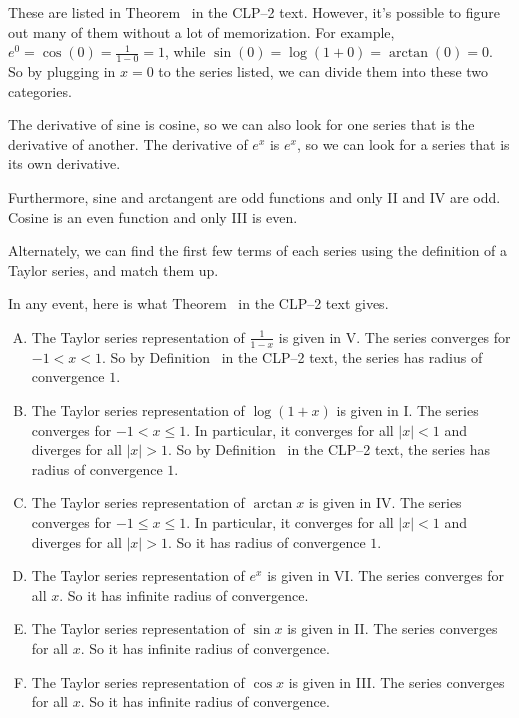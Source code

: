 \begin{solution}
These are listed in Theorem~ in the CLP--2 text. However, it's possible to figure out many of them without a lot of memorization. For example, $e^0=\cos(0)=\frac{1}{1-0}=1$, while $\sin(0)=\log(1+0)=\arctan(0)=0$. So by plugging in $x=0$ to the series listed, we can divide them into these two categories.

The derivative of sine is cosine, so we can also look for one series that is the derivative of another. The derivative of $e^x$ is $e^x$, so we can look for a series that is its own derivative.

Furthermore,      sine and arctangent are odd functions and only  II and IV are  odd.
Cosine is an even  function and only III is even.

Alternately, we can find the first few terms of each series using the definition of a Taylor series, and match them up.

In any event, here is what Theorem~ in the CLP--2 text gives.

\begin{enumerate}[(A)]
\item 
The Taylor series representation of $\frac{1}{1-x}$ is given in V. The series converges for $-1<x<1$. So by 
Definition~ in the CLP--2 text, the series has radius of convergence $1$.

\item 
The Taylor series representation of $\log(1+x)$ is given in I. The series converges for $-1<x\le 1$. In particular, it converges for all $|x|<1$ and diverges for all $|x|>1$. So by 
Definition~ in the CLP--2 text, the series has radius of convergence $1$.

\item 
The Taylor series representation of $\arctan x$ is given in IV. The series converges for $-1\le x\le 1$. In particular, it converges for all $|x|<1$ and diverges for all $|x|>1$. So it has radius of convergence $1$.

\item 
The Taylor series representation of $e^x$ is given in VI. The series converges for all $x$. So it has 
infinite radius of convergence.

\item 
The Taylor series representation of $\sin x$ is given in II. The series converges for all $x$. So it has 
infinite radius of convergence.

\item 
The Taylor series representation of $\cos x$ is given in III. The series converges for all $x$. So it has 
infinite radius of convergence.

\end{enumerate}
\end{solution}
